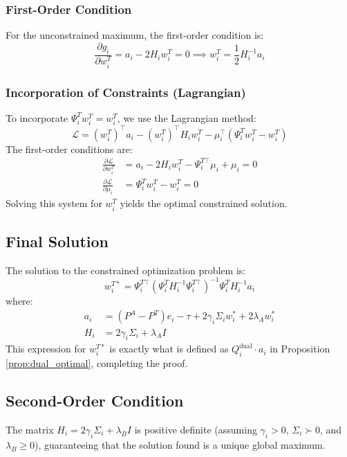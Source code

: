 \documentclass[12pt]{article}
\begin{document}
\subsubsection{First-Order Condition}
For the unconstrained maximum, the first-order condition is:
\begin{equation}
\frac{\partial g_i}{\partial w_i^T} = a_i - 2H_i w_i^T = 0 \implies w_i^T = \frac{1}{2}H_i^{-1} a_i
\end{equation}

\subsubsection{Incorporation of Constraints (Lagrangian)}
To incorporate $\Psi_i^T w_i^T = w_i^T$, we use the Lagrangian method:
\begin{equation}
\mathcal{L} = (w_i^T)^\top a_i - (w_i^T)^\top H_i w_i^T - \mu_i^\top(\Psi_i^T w_i^T - w_i^T)
\end{equation}
The first-order conditions are:
\begin{align}
\frac{\partial \mathcal{L}}{\partial w_i^T} &= a_i - 2H_i w_i^T - \Psi_i^{T\top}\mu_i + \mu_i = 0 \\
\frac{\partial \mathcal{L}}{\partial \mu_i} &= \Psi_i^T w_i^T - w_i^T = 0
\end{align}
Solving this system for $w_i^T$ yields the optimal constrained solution.

\subsection{Final Solution}
The solution to the constrained optimization problem is:
\begin{equation}
\boxed{w_i^{T*} = \Psi_i^{T\top}(\Psi_i^T H_i^{-1} \Psi_i^{T\top})^{-1} \Psi_i^T H_i^{-1} a_i}
\end{equation}
where:
\begin{align}
a_i &= (P^A - P^T)e_i - \tau + 2\gamma_i \Sigma_i w_i^* + 2\lambda_A w_i^* \\
H_i &= 2\gamma_i \Sigma_i + \lambda_A I
\end{align}
This expression for $w_i^{T*}$ is exactly what is defined as $Q_i^{\text{dual}} \cdot a_i$ in Proposition \ref{prop:dual_optimal}, completing the proof.

\subsection{Second-Order Condition}
The matrix $H_i = 2\gamma_i \Sigma_i + \lambda_B I$ is positive definite (assuming $\gamma_i > 0$, $\Sigma_i \succ 0$, and $\lambda_B \geq 0$), guaranteeing that the solution found is a unique global maximum.
\end{document}
